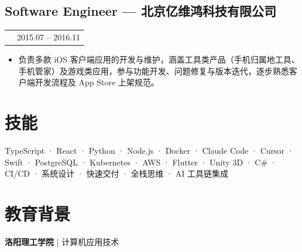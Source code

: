 \documentclass[11pt,a4paper]{article}
\makeatletter
\newcommand{\RoleLine}[3]{
  \begin{tabularx}{\textwidth}{@{}X r@{}}
    \textbf{#1} & #3 \\
  \end{tabularx}
  {\small #2}\par
}
\makeatother
\begin{document}
\subsection*{Software Engineer — 北京亿维鸿科技有限公司}
\RoleLine{}{}{2015.07 -- 2016.11}
\begin{itemize}
  \item 负责多款 iOS 客户端应用的开发与维护，涵盖工具类产品（手机归属地工具、手机管家）及游戏类应用，参与功能开发、问题修复与版本迭代，逐步熟悉客户端开发流程及 App Store 上架规范。
\end{itemize}

\section*{技能}
{\small TypeScript · React · Python · Node.js · Docker · Claude Code · Cursor · Swift · PostgreSQL · Kubernetes · AWS · Flutter · Unity 3D · C\# · CI/CD · 系统设计 · 快速交付 · 全栈思维 · AI 工具链集成}

\section*{教育背景}
\textbf{洛阳理工学院} \;|\; 计算机应用技术
\end{document}

